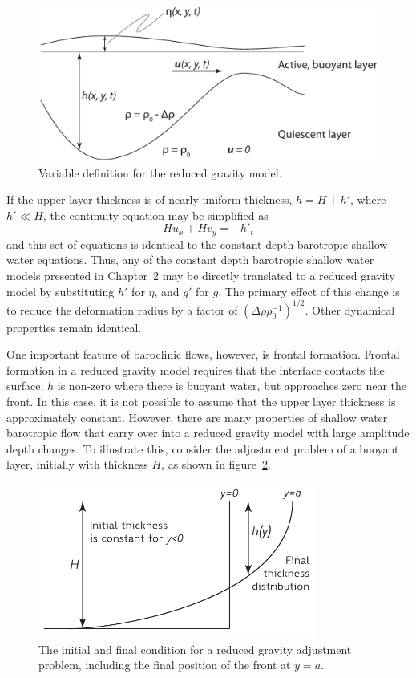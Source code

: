 \documentclass[11pt]{report}
\numberwithin{equation}{section}
\begin{document}
\begin{figure}[bt]
  \centering
    \includegraphics[width=5in]{reduced_gravity_variables.pdf}
    \caption{Variable definition for the reduced gravity model.}
  \label{fig:reduced_gravity_model}
\end{figure}

If the upper layer thickness is of nearly uniform thickness, $h = H + h'$, where $h' \ll H$, the continuity equation may be simplified as
\begin{equation}
    H u_x + H v_y = -h'_t
\end{equation}
and this set of equations is identical to the constant depth barotropic shallow water equations.  Thus, any of the constant depth barotropic shallow water models presented in Chapter~2 may be directly translated to a reduced gravity model by substituting $h'$ for $\eta$, and $g'$ for $g$.  The primary effect of this change is to reduce the deformation radius by a factor of $(\Delta\rho \rho_0^{-1})^{1/2}$.  Other dynamical properties remain identical.

One important feature of baroclinic flows, however, is frontal formation.  Frontal formation in a reduced gravity model requires that the interface contacts the surface; $h$ is non-zero where there is buoyant water, but approaches zero near the front.  In this case, it is not possible to assume that the upper layer thickness is approximately constant.  However, there are many properties of shallow water barotropic flow that carry over into a reduced gravity model with large amplitude depth changes.  To illustrate this, consider the adjustment problem of a buoyant layer, initially with thickness $H$, as shown in figure~\ref{fig:reduced_gravity_adjustment}.

\begin{figure}[bt]
    \centering
        \includegraphics[height=2in]{reduced_gravity_adjustment.pdf}
    \caption{The initial and final condition for a reduced gravity adjustment problem, including the final position of the front at $y=a$.}
    \label{fig:reduced_gravity_adjustment}
\end{figure}
\end{document}
